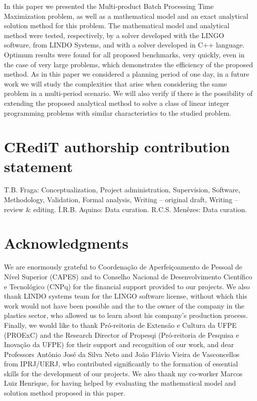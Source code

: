 \documentclass[authoryear,manuscript,12pt]{elsarticle}
\begin{document}
In this paper we presented the Multi-product Batch Processing Time Maximization problem, as well as a mathematical model and an exact analytical solution method for this problem. The mathematical model and analytical method were tested, respectively, by a solver developed with the LINGO software, from LINDO Systems, and with a solver developed in C++ language. Optimum results were found for all proposed benchmarks, very quickly, even in the case of very large problems, which demonstrates the efficiency of the proposed method. As in this paper we considered a planning period of one day, in a future work we will study the complexities that arise when considering the same problem in a multi-period scenario. We will also verify if there is the possibility of extending the proposed analytical method to solve a class of linear integer programming problems with similar characteristics to the studied problem.

\section{CRediT authorship contribution statement} 
\label{sec:contributions}

T.B. Fraga: Conceptualization, Project administration, Supervision, Software, Methodology, Validation, Formal analysis, Writing – original draft, Writing – review \& editing. Í.R.B. Aquino: Data curation. R.C.S. Menêzes: Data curation.

\section{Acknowledgments}
\label{sec:acknowledgments}

We are enormously grateful to Coordenação de Aperfeiçoamento de Pessoal de Nível Superior (CAPES) and to Conselho Nacional de Desenvolvimento Científico e Tecnológico (CNPq) for the financial support provided to our projects. We also thank LINDO systems team for the LINGO software license, without which this work would not have been possible and the to the owner of the company in the plastics sector, who allowed us to learn about his company's production process. Finally, we would like to thank Pró-reitoria de Extensão e Cultura da UFPE (PROExC) and the Research Director of Propesqi (Pró-reitoria de Pesquisa e Inovação da UFPE) for their support and recognition of our work, and dear Professors Antônio José da Silva Neto and João Flávio Vieira de Vasconcellos from IPRJ/UERJ, who contributed significantly to the formation of essential skills for the development of our projects. We also thank my co-worker Marcos Luiz Henrique, for having helped by evaluating the mathematical model and solution method proposed in this paper.
\end{document}
